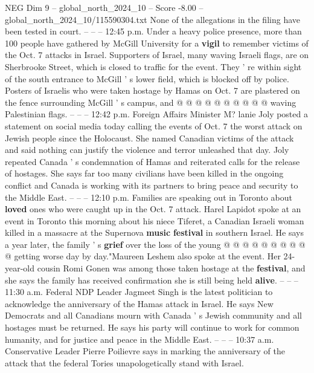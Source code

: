 \begin{textsample}{NEG Dim 9 – global\_north\_2024\_10 – Score -8.00 – global\_north\_2024\_10/115590304.txt}
None of the allegations in the filing have been tested in court. -- -- -- 12:45 p.m.
Under a heavy police presence, more than 100 people have gathered by McGill University for a \textbf{vigil} to remember victims of the Oct. 7 attacks in Israel.
Supporters of Israel, many waving Israeli flags, are on Sherbrooke Street, which is closed to traffic for the event.
They ' re within sight of the south entrance to McGill ' s lower field, which is blocked off by police.
Posters of Israelis who were taken hostage by Hamas on Oct. 7 are plastered on the fence surrounding McGill ' s campus, and @ @ @ @ @ @ @ @ @ @ waving Palestinian flags. -- -- -- 12:42 p.m.
Foreign Affairs Minister M? lanie Joly posted a statement on social media today calling the events of Oct. 7 the worst attack on Jewish people since the Holocaust.
She named Canadian victims of the attack and said nothing can justify the violence and terror unleashed that day.
Joly repeated Canada ' s condemnation of Hamas and reiterated calls for the release of hostages.
She says far too many civilians have been killed in the ongoing conflict and Canada is working with its partners to bring peace and security to the Middle East. -- -- -- 12:10 p.m.
Families are speaking out in Toronto about \textbf{loved} ones who were caught up in the Oct. 7 attack.
Harel Lapidot spoke at an event in Toronto this morning about his niece Tiferet, a Canadian Israeli woman killed in a massacre at the Supernova \textbf{music} \textbf{festival} in southern Israel.
He says a year later, the family ' s \textbf{grief} over the loss of the young @ @ @ @ @ @ @ @ @ @ getting worse day by day."Maureen Leshem also spoke at the event.
Her 24-year-old cousin Romi Gonen was among those taken hostage at the \textbf{festival}, and she says the family has received confirmation she is still being held \textbf{alive}. -- -- -- 11:30 a.m.
Federal NDP Leader Jagmeet Singh is the latest politician to acknowledge the anniversary of the Hamas attack in Israel.
He says New Democrats and all Canadians mourn with Canada ' s Jewish community and all hostages must be returned.
He says his party will continue to work for common humanity, and for justice and peace in the Middle East. -- -- -- 10:37 a.m.
Conservative Leader Pierre Poilievre says in marking the anniversary of the attack that the federal Tories unapologetically stand with Israel.

\end{textsample}
